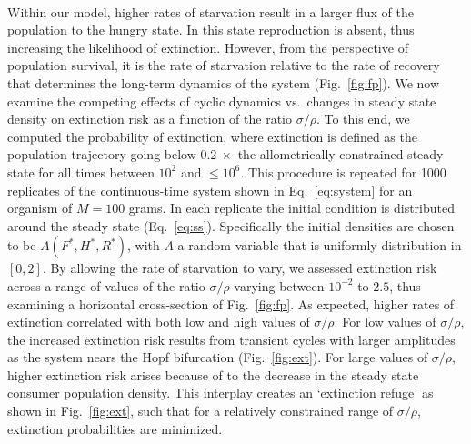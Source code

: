 \documentclass{pnastwo}
\begin{document}
\begin{article}
\\
Within our model, higher rates of starvation result in a larger flux of the
population to the hungry state.  In this state reproduction is absent, thus
increasing the likelihood of extinction.  However, from the perspective of
population survival, it is the rate of starvation relative to the rate of
recovery that determines the long-term dynamics of the system
(Fig.~\ref{fig:fp}).  We now examine the competing effects of cyclic dynamics
vs.\ changes in steady state density on extinction risk as a function of the
ratio $\sigma/\rho$.  To this end, we computed the probability of extinction,
where extinction is defined as the population trajectory going below
$0.2~\times$ the allometrically constrained steady state for all times
between $10^2$ and $\leq 10^6$.  This procedure is repeated for 1000
replicates of the continuous-time system shown in Eq.~\ref{eq:system} for an
organism of $M=100$ grams.  
In each replicate the initial condition is
distributed around the steady state (Eq.~\ref{eq:ss}).  Specifically the
initial densities are chosen to be $A(F^*,H^*,R^*)$, with $A$ a random
variable that is uniformly distribution in $[0,2]$.  By allowing the rate of
starvation to vary, we assessed extinction risk across a range of values of
the ratio $\sigma/\rho$ varying between $10^{-2}$ to $2.5$, thus examining a
horizontal cross-section of Fig.~\ref{fig:fp}.  
As expected, higher rates of
extinction correlated with both low and high values of $\sigma/\rho$.  For
low values of $\sigma/\rho$, the increased extinction risk results from
transient cycles with larger amplitudes as the system nears the Hopf
bifurcation (Fig.~\ref{fig:ext}).  For large values of $\sigma/\rho$, higher
extinction risk arises because of to the decrease in the steady state
consumer population density.  This interplay creates an `extinction refuge'
as shown in Fig.~\ref{fig:ext}, such that for a relatively constrained range
of $\sigma/\rho$, extinction probabilities are minimized.


\end{article}
\end{document}
